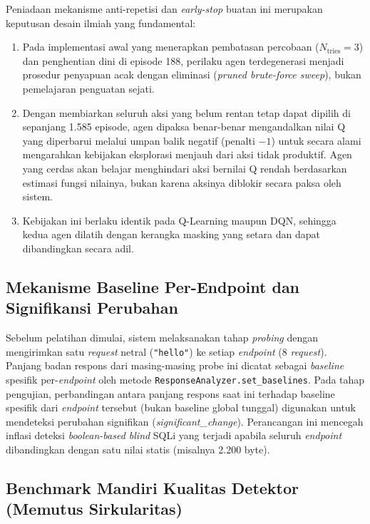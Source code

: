 \begin{enumerate}
Peniadaan mekanisme anti-repetisi dan \textit{early-stop} buatan ini merupakan keputusan desain ilmiah yang fundamental:
\begin{enumerate}
    \item Pada implementasi awal yang menerapkan pembatasan percobaan ($N_{\text{tries}} = 3$) dan penghentian dini di episode 188, perilaku agen terdegenerasi menjadi prosedur penyapuan acak dengan eliminasi (\textit{pruned brute-force sweep}), bukan pemelajaran penguatan sejati.
    \item Dengan membiarkan seluruh aksi yang belum rentan tetap dapat dipilih di sepanjang 1.585 episode, agen dipaksa benar-benar mengandalkan nilai Q yang diperbarui melalui umpan balik negatif (penalti $-1$) untuk secara alami mengarahkan kebijakan eksplorasi menjauh dari aksi tidak produktif. Agen yang cerdas akan belajar menghindari aksi bernilai Q rendah berdasarkan estimasi fungsi nilainya, bukan karena aksinya diblokir secara paksa oleh sistem.
    \item Kebijakan ini berlaku identik pada Q-Learning maupun DQN, sehingga kedua agen dilatih dengan kerangka masking yang setara dan dapat dibandingkan secara adil.
\end{enumerate}

\subsection{Mekanisme Baseline Per-Endpoint dan Signifikansi Perubahan}

Sebelum pelatihan dimulai, sistem melaksanakan tahap \textit{probing} dengan mengirimkan satu \textit{request} netral (\texttt{"hello"}) ke setiap \textit{endpoint} (8 \textit{request}). Panjang badan respons dari masing-masing probe ini dicatat sebagai \textit{baseline} spesifik per-\textit{endpoint} oleh metode \texttt{ResponseAnalyzer.set\_baselines}. Pada tahap pengujian, perbandingan antara panjang respons saat ini terhadap baseline spesifik dari \textit{endpoint} tersebut (bukan baseline global tunggal) digunakan untuk mendeteksi perubahan signifikan (\textit{significant\_change}). Perancangan ini mencegah inflasi deteksi \textit{boolean-based blind} SQLi yang terjadi apabila seluruh \textit{endpoint} dibandingkan dengan satu nilai statis (misalnya 2.200 byte).

\subsection{Benchmark Mandiri Kualitas Detektor (Memutus Sirkularitas)}


\end{enumerate}

